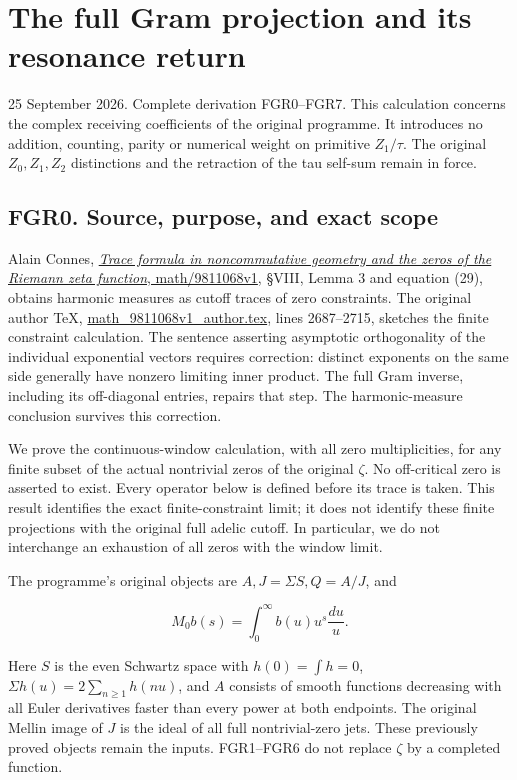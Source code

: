 \section{The full Gram projection and its resonance
return}\label{the-full-gram-projection-and-its-resonance-return}

25 September 2026. Complete derivation FGR0--FGR7. This calculation
concerns the complex receiving coefficients of the original programme.
It introduces no addition, counting, parity or numerical weight on
primitive \(Z_1/\tau\). The original \(Z_0,Z_1,Z_2\) distinctions and
the retraction of the tau self-sum remain in force.

\subsection{FGR0. Source, purpose, and exact
scope}\label{fgr0.-source-purpose-and-exact-scope}

Alain Connes, \href{https://arxiv.org/abs/math/9811068v1}{\emph{Trace
formula in noncommutative geometry and the zeros of the Riemann zeta
function}, math/9811068v1}, §VIII, Lemma 3 and equation (29), obtains
harmonic measures as cutoff traces of zero constraints. The original
author TeX,
\href{https://arxiv.org/abs/math/9811068v1}{math\_9811068v1\_author.tex},
lines 2687--2715, sketches the finite constraint calculation. The
sentence asserting asymptotic orthogonality of the individual
exponential vectors requires correction: distinct exponents on the same
side generally have nonzero limiting inner product. The full Gram
inverse, including its off-diagonal entries, repairs that step. The
harmonic-measure conclusion survives this correction.

We prove the continuous-window calculation, with all zero
multiplicities, for any finite subset of the actual nontrivial zeros of
the original \(\zeta\). No off-critical zero is asserted to exist. Every
operator below is defined before its trace is taken. This result
identifies the exact finite-constraint limit; it does not identify these
finite projections with the original full adelic cutoff. In particular,
we do not interchange an exhaustion of all zeros with the window limit.

The programme's original objects are \(A,J=\Sigma S,Q=A/J\), and

\[
 M_0b(s)=\int_0^\infty b(u)u^s\frac{du}{u}.
\]

Here \(S\) is the even Schwartz space with \(h(0)=\int h=0\),
\(\Sigma h(u)=2\sum_{n\geq1}h(nu)\), and \(A\) consists of smooth
functions decreasing with all Euler derivatives faster than every power
at both endpoints. The original Mellin image of \(J\) is the ideal of
all full nontrivial-zero jets. These previously proved objects remain
the inputs. FGR1--FGR6 do not replace \(\zeta\) by a completed function.

